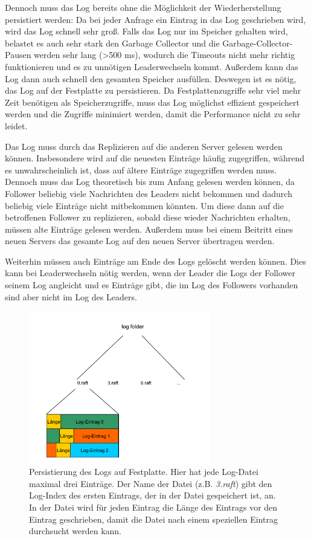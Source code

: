 Dennoch muss das Log bereits ohne die Möglichkeit der Wiederherstellung persistiert werden: Da bei jeder Anfrage ein Eintrag in das Log geschrieben wird, wird das Log schnell sehr groß. Falls das Log nur im Speicher gehalten wird, belastet es auch sehr stark den Garbage Collector und die Garbage-Collector-Pausen werden sehr lang (\textgreater 500 ms), wodurch die Timeouts nicht mehr richtig funktionieren und es zu unnötigen Leaderwechseln kommt. Außerdem kann das Log dann auch schnell den gesamten Speicher ausfüllen. Deswegen ist es nötig, das Log auf der Festplatte zu persistieren. Da Festplattenzugriffe sehr viel mehr Zeit benötigen als Speicherzugriffe, muss das Log möglichst effizient gespeichert werden und die Zugriffe minimiert werden, damit die Performance nicht zu sehr leidet.

Das Log muss durch das Replizieren auf die anderen Server gelesen werden können. Insbesondere wird auf die neuesten Einträge häufig zugegriffen, während es unwahrscheinlich ist, dass auf ältere Einträge zugegriffen werden muss. Dennoch muss das Log theoretisch bis zum Anfang gelesen werden können, da Follower beliebig viele Nachrichten des Leaders nicht bekommen und dadurch beliebig viele Einträge nicht mitbekommen könnten. Um diese dann auf die betroffenen Follower zu replizieren, sobald diese wieder Nachrichten erhalten, müssen alte Einträge gelesen werden. Außerdem muss bei einem Beitritt eines neuen Servers das gesamte Log auf den neuen Server übertragen werden.

Weiterhin müssen auch Einträge am Ende des Logs gelöscht werden können. Dies kann bei Leaderwechseln nötig werden, wenn der Leader die Logs der Follower seinem Log angleicht und es Einträge gibt, die im Log des Followers vorhanden sind aber nicht im Log des Leaders.

\begin{figure}[h]
	\centering
	\includegraphics[width=300px]{img/log-files.pdf}
	\caption{Persistierung des Logs auf Festplatte. Hier hat jede Log-Datei maximal drei Einträge. Der Name der Datei (z.B. \textit{3.raft}) gibt den Log-Index des ersten Eintrags, der in der Datei gespeichert ist, an. In der Datei wird für jeden Eintrag die Länge des Eintrags vor den Eintrag geschrieben, damit die Datei nach einem speziellen Eintrag durchsucht werden kann.}
	\label{fig:log-files}
\end{figure}

